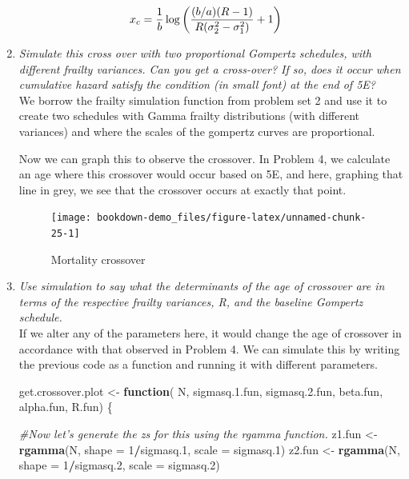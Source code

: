 \documentclass[]{book}
\newenvironment{Shaded}{\begin{snugshade}}{\end{snugshade}}
\newcommand{\CommentTok}[1]{\textcolor[rgb]{0.56,0.35,0.01}{\textit{#1}}}
\newcommand{\ControlFlowTok}[1]{\textcolor[rgb]{0.13,0.29,0.53}{\textbf{#1}}}
\newcommand{\DataTypeTok}[1]{\textcolor[rgb]{0.13,0.29,0.53}{#1}}
\newcommand{\DecValTok}[1]{\textcolor[rgb]{0.00,0.00,0.81}{#1}}
\newcommand{\FloatTok}[1]{\textcolor[rgb]{0.00,0.00,0.81}{#1}}
\newcommand{\KeywordTok}[1]{\textcolor[rgb]{0.13,0.29,0.53}{\textbf{#1}}}
\newcommand{\NormalTok}[1]{#1}
\newcommand{\OperatorTok}[1]{\textcolor[rgb]{0.81,0.36,0.00}{\textbf{#1}}}
\newcommand{\StringTok}[1]{\textcolor[rgb]{0.31,0.60,0.02}{#1}}
\begin{document}
\begin{enumerate}
\[\begin{aligned}
   x_c & = {1 \over b} \log \bigg({ {(b/a)(R-1)}\over R(\sigma^2_2-\sigma^2_1)} +1\bigg)
   \end{aligned}\]
\item
  \emph{Simulate this cross over with two proportional Gompertz schedules, with different frailty variances. Can you get a cross-over? If so, does it occur when cumulative hazard satisfy the condition (in small font) at the end of 5E?}\\
  We borrow the frailty simulation function from problem set 2 and use it to create two schedules with Gamma frailty distributions (with different variances) and where the scales of the gompertz curves are proportional.

  Now we can graph this to observe the crossover. In Problem 4, we calculate an age where this crossover would occur based on 5E, and here, graphing that line in grey, we see that the crossover occurs at exactly that point.\\

  \begin{figure}
  \texttt{[image: bookdown-demo\_files/figure-latex/unnamed-chunk-25-1]} \caption{Mortality crossover}\label{fig:unnamed-chunk-25}
  \end{figure}
\item
  \emph{Use simulation to say what the determinants of the age of crossover are in terms of the respective frailty variances, R, and the baseline Gompertz schedule.}\\
  If we alter any of the parameters here, it would change the age of crossover in accordance with that observed in Problem 4. We can simulate this by writing the previous code as a function and running it with different parameters.

\begin{Shaded}
\begin{Highlighting}[]
\NormalTok{get.crossover.plot <-}\StringTok{ }\ControlFlowTok{function}\NormalTok{( N, sigmasq.}\FloatTok{1.}\NormalTok{fun, sigmasq.}\FloatTok{2.}\NormalTok{fun, beta.fun, alpha.fun, R.fun) \{}

\CommentTok{#Now let's generate the zs for this using the rgamma function.}
\NormalTok{z1.fun <-}\StringTok{ }\KeywordTok{rgamma}\NormalTok{(N, }\DataTypeTok{shape =} \DecValTok{1}\OperatorTok{/}\NormalTok{sigmasq}\FloatTok{.1}\NormalTok{, }\DataTypeTok{scale =}\NormalTok{ sigmasq}\FloatTok{.1}\NormalTok{)}
\NormalTok{z2.fun <-}\StringTok{ }\KeywordTok{rgamma}\NormalTok{(N, }\DataTypeTok{shape =} \DecValTok{1}\OperatorTok{/}\NormalTok{sigmasq}\FloatTok{.2}\NormalTok{, }\DataTypeTok{scale =}\NormalTok{ sigmasq}\FloatTok{.2}\NormalTok{)}


\end{Highlighting}
\end{Shaded}
\end{enumerate}
\end{document}
